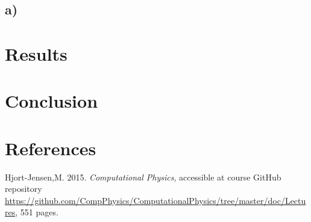 \documentclass[12pt]{article}
\begin{document}
\subsection*{a)}

\section{Results}
\section{Conclusion}
\section{References}
Hjort-Jensen,M. 2015. \textit{Computational Physics}, accessible at course GitHub repository \url{https://github.com/CompPhysics/ComputationalPhysics/tree/master/doc/Lectures}, 551 pages.
\end{document}
